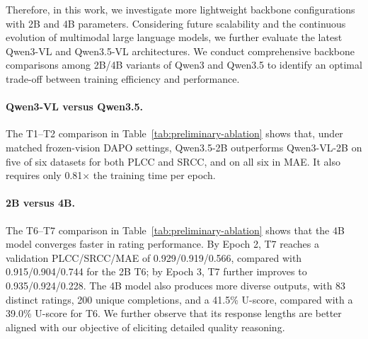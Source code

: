 Therefore, in this work, we investigate more lightweight backbone configurations with 2B and 4B parameters.
Considering future scalability and the continuous evolution of multimodal large language models, we further evaluate the latest Qwen3-VL and Qwen3.5-VL architectures.
We conduct comprehensive backbone comparisons among 2B/4B variants of Qwen3 and Qwen3.5 to identify an optimal trade-off between training efficiency and performance.

\paragraph{Qwen3-VL versus Qwen3.5.}
The T1--T2 comparison in Table~\ref{tab:preliminary-ablation} shows that, under
matched frozen-vision DAPO settings, Qwen3.5-2B outperforms Qwen3-VL-2B on five
of six datasets for both PLCC and SRCC, and on all six in MAE. It also requires
only 0.81$\times$ the training time per epoch.

\paragraph{2B versus 4B.}
The T6--T7 comparison in Table~\ref{tab:preliminary-ablation} shows that the 4B
model converges faster in rating performance. By Epoch 2, T7 reaches a
validation PLCC/SRCC/MAE of
0.929/0.919/0.566, compared with 0.915/0.904/0.744 for the 2B T6; by Epoch 3,
T7 further improves to 0.935/0.924/0.228. The 4B model also produces more
diverse outputs, with 83 distinct ratings, 200 unique completions, and a
41.5\% U-score, compared with a 39.0\% U-score for T6. We further observe that
its response lengths are better aligned with our objective of eliciting
detailed quality reasoning.

